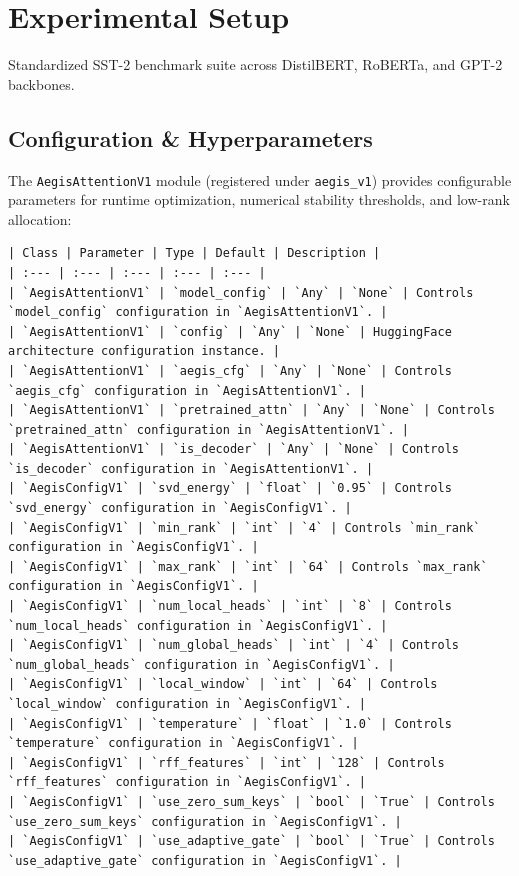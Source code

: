 \section{Experimental Setup}Standardized SST-2 benchmark suite across DistilBERT, RoBERTa, and GPT-2 backbones.



\subsection{Configuration \& Hyperparameters}
The \texttt{AegisAttentionV1} module (registered under \texttt{aegis\_v1}) provides configurable parameters for runtime optimization, numerical stability thresholds, and low-rank allocation:

\begin{verbatim}
| Class | Parameter | Type | Default | Description |
| :--- | :--- | :--- | :--- | :--- |
| `AegisAttentionV1` | `model_config` | `Any` | `None` | Controls `model_config` configuration in `AegisAttentionV1`. |
| `AegisAttentionV1` | `config` | `Any` | `None` | HuggingFace architecture configuration instance. |
| `AegisAttentionV1` | `aegis_cfg` | `Any` | `None` | Controls `aegis_cfg` configuration in `AegisAttentionV1`. |
| `AegisAttentionV1` | `pretrained_attn` | `Any` | `None` | Controls `pretrained_attn` configuration in `AegisAttentionV1`. |
| `AegisAttentionV1` | `is_decoder` | `Any` | `None` | Controls `is_decoder` configuration in `AegisAttentionV1`. |
| `AegisConfigV1` | `svd_energy` | `float` | `0.95` | Controls `svd_energy` configuration in `AegisConfigV1`. |
| `AegisConfigV1` | `min_rank` | `int` | `4` | Controls `min_rank` configuration in `AegisConfigV1`. |
| `AegisConfigV1` | `max_rank` | `int` | `64` | Controls `max_rank` configuration in `AegisConfigV1`. |
| `AegisConfigV1` | `num_local_heads` | `int` | `8` | Controls `num_local_heads` configuration in `AegisConfigV1`. |
| `AegisConfigV1` | `num_global_heads` | `int` | `4` | Controls `num_global_heads` configuration in `AegisConfigV1`. |
| `AegisConfigV1` | `local_window` | `int` | `64` | Controls `local_window` configuration in `AegisConfigV1`. |
| `AegisConfigV1` | `temperature` | `float` | `1.0` | Controls `temperature` configuration in `AegisConfigV1`. |
| `AegisConfigV1` | `rff_features` | `int` | `128` | Controls `rff_features` configuration in `AegisConfigV1`. |
| `AegisConfigV1` | `use_zero_sum_keys` | `bool` | `True` | Controls `use_zero_sum_keys` configuration in `AegisConfigV1`. |
| `AegisConfigV1` | `use_adaptive_gate` | `bool` | `True` | Controls `use_adaptive_gate` configuration in `AegisConfigV1`. |

\end{verbatim}

